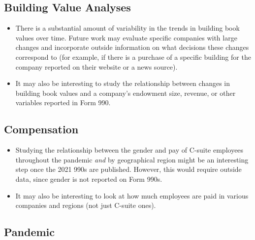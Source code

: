 \documentclass[Dance Data
Project,article,submit,moreauthors,pdftex]{mdpi}
\providecommand{\tightlist}{%
  \setlength{\itemsep}{0pt}\setlength{\parskip}{0pt}}
\begin{document}
\hypertarget{building-value-analyses}{%
\subsection{Building Value Analyses}\label{building-value-analyses}}

\begin{itemize}
\tightlist
\item
  There is a substantial amount of variability in the trends in building
  book values over time. Future work may evaluate specific companies
  with large changes and incorporate outside information on what
  decisions these changes correspond to (for example, if there is a
  purchase of a specific building for the company reported on their
  website or a news source).\\
\item
  It may also be interesting to study the relationship between changes
  in building book values and a company's endowment size, revenue, or
  other variables reported in Form 990.
\end{itemize}

\hypertarget{compensation-1}{%
\subsection{Compensation}\label{compensation-1}}

\begin{itemize}
\tightlist
\item
  Studying the relationship between the gender and pay of C-suite
  employees throughout the pandemic \emph{and} by geographical region
  might be an interesting step once the 2021 990s are published.
  However, this would require outside data, since gender is not reported
  on Form 990s.\\
\item
  It may also be interesting to look at how much employees are paid in
  various companies and regions (not just C-suite ones).
\end{itemize}

\hypertarget{pandemic}{%
\subsection{Pandemic}\label{pandemic}}
\end{document}
